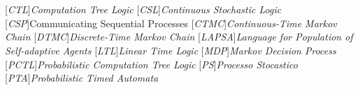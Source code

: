     \chapter*{\acronymname}
    \begin{acronym}[LAPSA]
		[\emph{CTL}]{\emph{Computation Tree Logic}}
		[\emph{CSL}]{\emph{Continuous Stochastic Logic}}
		[\emph{CSP}]{Communicating Sequential Processes}
		[\emph{CTMC}]{\emph{Continuous-Time Markov Chain}}
		[\emph{DTMC}]{\emph{Discrete-Time Markov Chain}}
		[\emph{LAPSA}]{\emph{Language for Population of Self-adaptive Agents}}
		[\emph{LTL}]{\emph{Linear Time Logic}}
		[\emph{MDP}]{\emph{Markov Decision Process}}		
		[\emph{PCTL}]{\emph{Probabilistic Computation Tree Logic}}
		[\emph{PS}]{\emph{Processo Stocastico}}
		[\emph{PTA}]{\emph{Probabilistic Timed Automata}}
    \end{acronym}
\endgroup

\cleardoublepage